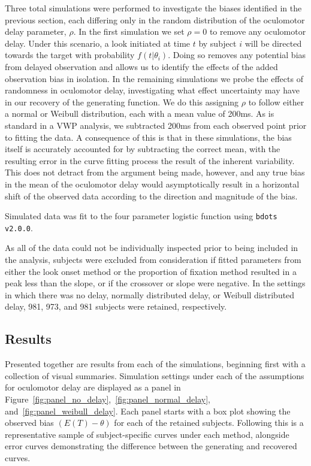 \documentclass{article}
\newcommand{\xt}{\texttt}
\begin{document}
Three total simulations were performed to investigate the biases identified in the previous section, each differing only in the random distribution of the oculomotor delay parameter, $\rho$. In the first simulation we set $\rho = 0$ to remove any oculomotor delay. Under this scenario, a look initiated at time $t$ by subject $i$ will be directed towards the target with probability $f(t|\theta_i)$. Doing so removes any potential bias from delayed observation and allows us to identify the effects of the added observation bias in isolation. In the remaining simulations we probe the effects of randomness in oculomotor delay, investigating what effect uncertainty may have in our recovery of the generating function. We do this assigning $\rho$ to follow either a normal or Weibull distribution, each with a mean value of 200ms. As is standard in a VWP analysis, we subtracted 200ms from each observed point prior to fitting the data. A consequence of this is that in these simulations, the bias itself is accurately accounted for by subtracting the correct mean, with the resulting error in the curve fitting process the result of the inherent variability. This does not detract from the argument being made, however, and any true bias in the mean of the oculomotor delay would asymptotically result in a horizontal shift of the observed data according to the direction and magnitude of the bias.

Simulated data was fit to the four parameter logistic function using \xt{bdots v2.0.0}.

As all of the data could not be individually inspected prior to being included in the analysis, subjects were excluded from consideration if fitted parameters from either the look onset method or the proportion of fixation method resulted in a peak less than the slope, or if the crossover or slope were negative. In the settings in which there was no delay, normally distributed delay, or Weibull distributed delay, 981, 973, and 981 subjects were retained, respectively.


\subsection{Results}

Presented together are results from each of the simulations, beginning first with a collection of visual summaries. Simulation settings under each of the assumptions for oculomotor delay are displayed as a panel in Figure~\ref{fig:panel_no_delay},~\ref{fig:panel_normal_delay}, and~\ref{fig:panel_weibull_delay}. Each panel starts with a box plot showing the observed bias $(E(T) - \theta)$ for each of the retained subjects. Following this is a representative sample of subject-specific curves under each method, alongside error curves demonstrating the difference between the generating and recovered curves. 
\end{document}
